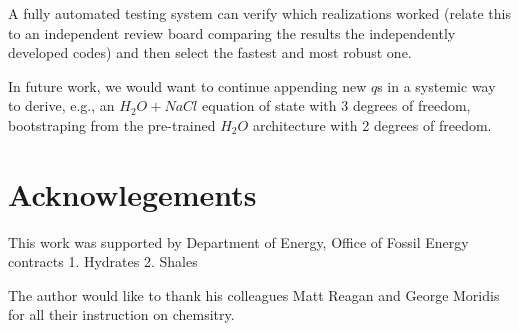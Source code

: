 \documentclass[]{article}
\begin{document}
A fully automated testing system can verify which realizations worked
(relate this to an independent review board comparing the results the
independently developed codes) and then select the fastest and most
robust one.


In future work, we would want to continue appending new \(q\)s in a
systemic way to derive, e.g., an \(H_2O + NaCl\) equation of state with
3 degrees of freedom, bootstraping from the pre-trained \(H_2O\)
architecture with 2 degrees of freedom.

\section*{Acknowlegements}

This work was supported by Department of Energy, Office of Fossil
Energy contracts
1. Hydrates
2. Shales

The author would like to thank his colleagues Matt Reagan and George
Moridis for all their instruction on chemsitry. 


\end{document}
